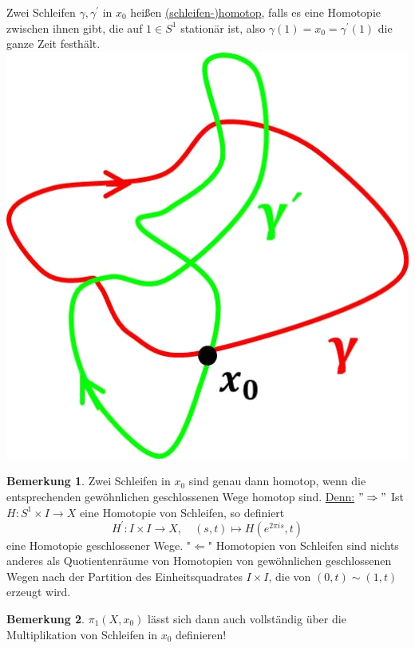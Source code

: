 \documentclass[a4paper,11pt,notitlepage]{report}
\theoremstyle{definition}
\newtheorem{remark}{Bemerkung}[chapter]
\newenvironment{definition}[1]{
	\begin{definitions}
	\marginnote{\emph{#1}}
}{\end{definitions}}
\begin{document}
\begin{definition}{schleifenhomotop}
	Zwei Schleifen $\gamma, \gamma^\prime$ in $x_0$ heißen \underline{(schleifen-)homotop}, falls es eine Homotopie zwischen ihnen gibt, die auf $1 \in S^1$ stationär ist, also
	$\gamma(1) = x_0 = \gamma^\prime(1)$ die ganze Zeit festhält.
	 \newline \includegraphics[scale=0.3]{images/schleifenhomotop.png}
\end{definition}

\begin{remark}{}
	Zwei Schleifen in $x_0$ sind genau dann homotop, wenn die entsprechenden gewöhnlichen geschlossenen Wege homotop sind.
	\newline
	\underline{Denn:} $"\Rightarrow"$ Ist $H \colon S^1 \times I \rightarrow X$ eine Homotopie von Schleifen, so definiert 
	$$H^\prime \colon I \times I \rightarrow X,\quad (s,t) \mapsto H(e^{2 \pi i s}, t)$$
	eine Homotopie geschlossener Wege.
	\newline
	"$\Leftarrow$" Homotopien von Schleifen sind nichts anderes als Quotientenräume von Homotopien von gewöhnlichen geschlossenen Wegen nach der Partition des Einheitsquadrates $I \times I$, die von $(0,t) \sim (1,t)$ erzeugt wird.
\end{remark}

\begin{remark}{}
	$\pi_1(X,x_0)$ lässt sich dann auch vollständig über die Multiplikation von Schleifen in $x_0$ definieren!
\end{remark}
\end{document}
